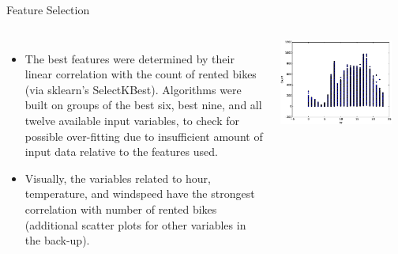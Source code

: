 \documentclass[pdf]{beamer}
\begin{document}

\begin{frame}{Feature Selection}
\begin{columns}
\begin{itemize}
\small
\item{The best features were determined by their linear correlation with the count of rented bikes (via sklearn's SelectKBest).  Algorithms were built on groups of the best six, best nine, and all twelve available input variables, to check for possible over-fitting due to insufficient amount of input data relative to the features used.}
\begin{center}
\end{center}
\item{Visually, the variables related to hour, temperature, and windspeed have the strongest correlation with number of rented bikes (additional scatter plots for other variables in the back-up).}
\end{itemize}
\begin{center}
\includegraphics[width=0.9\textwidth]{plots/hr_v_Count_corrcheck.eps}\\

\end{center}
\end{columns}
\end{frame}
\end{document}
